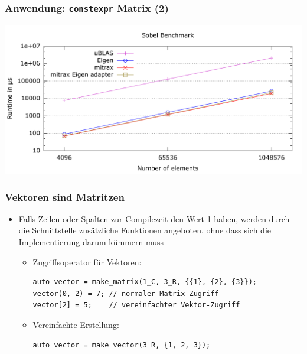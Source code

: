 \documentclass{beamer}
\begin{document}
\begin{frame}
    \frametitle{Anwendung: \texttt{constexpr} Matrix (2)}
    \includegraphics[width=\textwidth]{images/sobel2.pdf}
\end{frame}
\begin{frame}[fragile]
    \frametitle{Vektoren sind Matritzen}
    \begin{itemize}
        \item Falls Zeilen oder Spalten zur Compilezeit den Wert 1 haben, werden durch die Schnittstelle zusätzliche Funktionen angeboten, ohne dass sich die Implementierung darum kümmern muss
        \begin{itemize}
            \item Zugriffsoperator für Vektoren:
\begin{verbatim}
auto vector = make_matrix(1_C, 3_R, {{1}, {2}, {3}});
vector(0, 2) = 7; // normaler Matrix-Zugriff
vector[2] = 5;    // vereinfachter Vektor-Zugriff
\end{verbatim}
            \item Vereinfachte Erstellung:
\begin{verbatim}
auto vector = make_vector(3_R, {1, 2, 3});
\end{verbatim}
        \end{itemize}
    \end{itemize}
\end{frame}
\end{document}
